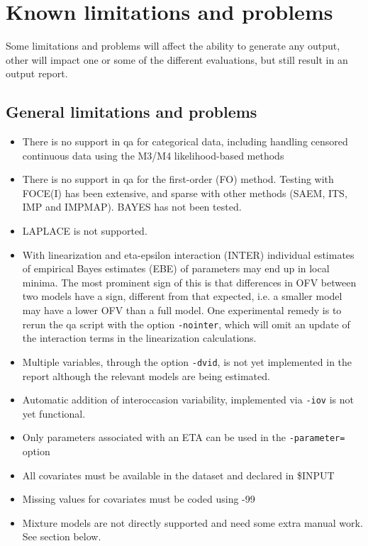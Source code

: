 \section{Known limitations and problems}

Some limitations and problems will affect the ability to generate any output, other will impact one or some of the different evaluations, but still result in an output report. 

\subsection{General limitations and problems}
\begin{itemize}
	\item There is no support in qa for categorical data, including handling censored continuous data using the M3/M4 likelihood-based methods
	\item There is no support in qa for the first-order (FO) method. Testing with FOCE(I) has been extensive, and sparse with other methods (SAEM, ITS, IMP and IMPMAP). BAYES has not been tested. 
    \item LAPLACE is not supported.
	\item With linearization and eta-epsilon interaction (INTER) individual estimates of empirical Bayes estimates (EBE) of parameters may end up in local minima. The most prominent sign of this is that differences in OFV between two models have a sign, different from that expected, i.e. a smaller model may have a lower OFV than a full model. One experimental remedy is to rerun the qa script with the option \verb|-nointer|, which will omit an update of the interaction terms in the linearization calculations.
	\item Multiple variables, through the option \verb|-dvid|, is not yet implemented in the report although the relevant models are being estimated.
	\item Automatic addition of interoccasion variability, implemented via \verb|-iov| is not yet functional.
	\item Only parameters associated with an ETA can be used in the \verb|-parameter=| option
    \item All covariates must be available in the dataset and declared in \$INPUT
    \item Missing values for covariates must be coded using -99
    \item Mixture models are not directly supported and need some extra manual work. See section below.
\end{itemize}

